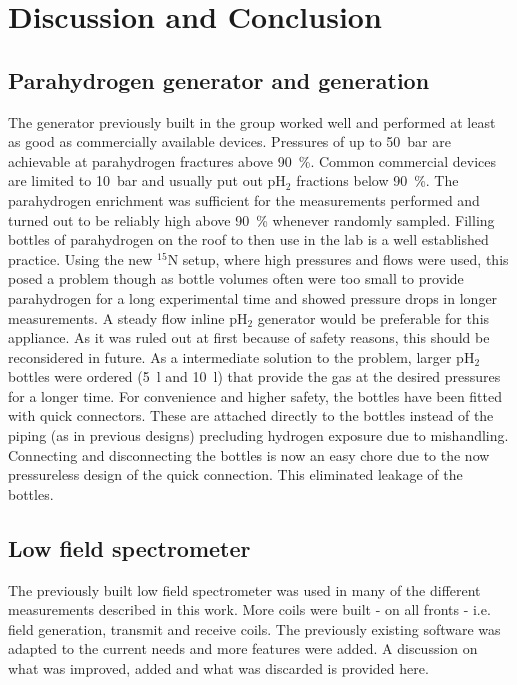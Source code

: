 \chapter{Discussion and Conclusion}
    \label{chap:conclusion}
    \section{Parahydrogen generator and generation}
        The generator previously built in the group worked well and performed at least as good as commercially available devices. Pressures of up to \SI{50}{\bar} are achievable at parahydrogen fractures above \SI{90}{\%}. Common commercial devices are limited to \SI{10}{\bar} and usually put out pH$_2$ fractions below \SI{90}{\%}. The parahydrogen enrichment was sufficient for the measurements performed and turned out to be reliably high above \SI{90}{\%} whenever randomly sampled.
        Filling bottles of parahydrogen on the roof to then use in the lab is a well established practice. Using the new $^{15}$N setup, where high pressures and flows were used, this posed a problem though as bottle volumes often were too small to provide parahydrogen for a long experimental time and showed pressure drops in longer measurements. A steady flow inline pH$_2$ generator would be preferable for this appliance. As it was ruled out at first because of safety reasons, this should be reconsidered in future. As a intermediate solution to the problem, larger pH$_2$ bottles were ordered (\SI{5}{\l} and \SI{10}{\l}) that provide the gas at the desired pressures for a longer time. For convenience and higher safety, the bottles have been fitted with quick connectors. These are attached directly to the bottles instead of the piping (as in previous designs) precluding hydrogen exposure due to mishandling. Connecting and disconnecting the bottles is now an easy chore due to the now pressureless design of the quick connection. This eliminated leakage of the bottles.
    \section{Low field spectrometer}
        The previously built low field spectrometer was used in many of the different measurements described in this work. More coils were built - on all fronts - i.e. field generation, transmit and receive coils. The previously existing software was adapted to the current needs and more features were added. A discussion on what was improved, added and  what was discarded is provided here.
